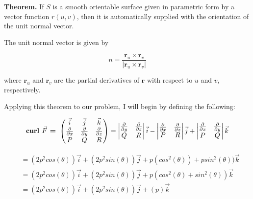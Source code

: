 \documentclass[a4paper]{article}
\begin{document}
\textbf{Theorem.} If $S$ is a smooth orientable surface given in parametric form by a vector function $r(u,v)$, then it is automatically supplied with the orientation of the unit normal vector.

The unit normal vector is given by

\begin{equation}
    n = \frac{\textbf{r}_u \times \textbf{r}_v}{|\textbf{r}_u \times \textbf{r}_v|}
\end{equation}

where $\textbf{r}_u$ and $\textbf{r}_v$ are the partial derivatives of $\textbf{r}$ with respect to $u$ and $v$, respectively.

Applying this theorem to our problem, I will begin by defining the following:

\begin{align}
    \text{\textbf{curl }}\vec{F}\text{\textbf{ = }}
    \begin{pmatrix}
        \vec{i} & \vec{j} & \vec{k} \\
        \frac{\partial}{\partial x} &   \frac{\partial}{\partial y} &   \frac{\partial}{\partial z} \\
        P & Q & R 
    \end{pmatrix}
    =
    \begin{vmatrix}
         \frac{\partial}{\partial y} & \frac{\partial}{\partial z} \\
         Q & R 
    \end{vmatrix}
    \vec{i} - 
    \begin{vmatrix}
         \frac{\partial}{\partial x} & \frac{\partial}{\partial z} \\
         P & R 
    \end{vmatrix}
    \vec{j} +
     \begin{vmatrix}
         \frac{\partial}{\partial x} & \frac{\partial}{\partial y} \\
         P & Q 
    \end{vmatrix}
    \vec{k} 
\end{align}


\begin{align}
    &= (2p^2cos(\theta))\vec{i} + (2p^2sin(\theta))\vec{j} + p(cos^2(\theta)) + psin^2(\theta))\vec{k} \\
    &= (2p^2cos(\theta))\vec{i} + (2p^2sin(\theta))\vec{j} + p(cos^2(\theta) + sin^2(\theta))\vec{k} \\
    &= (2p^2cos(\theta))\vec{i} + (2p^2sin(\theta))\vec{j} + (p)\vec{k} \\
\end{align}
\end{document}
